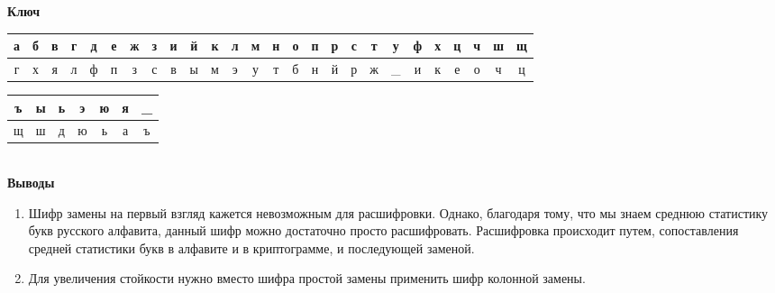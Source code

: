 \documentclass[a4paper,14pt]{extarticle}
\begin{document}
    \begin{center}
        \textbf{Ключ}
    \end{center}
    \vspace{-3em}
    \begin{center}
        \begin{tabular}{|c|c|c|c|c|c|c|c|c|c|c|c|c|c|c|c|c|c|c|c|c|c|c|c|c|c|}
            \hline
            а & б & в & г & д & е & ж & з & и & й & к & л & м & н & о & п & р & с & т & у & ф & х & ц & ч & ш & щ \\
            \hline
            г & х & я & л & ф & п & з & с & в & ы & м & э & у & т & б & н & й & р & ж &\_ & и & к & е & о & ч & ц \\
            \hline
        \end{tabular}
    \end{center}
    \begin{tabular}{|c|c|c|c|c|c|c|}
        \hline
        ъ & ы & ь & э & ю & я & \_ \\
        \hline
        щ & ш & д & ю & ь & а & ъ \\
        \hline
    \end{tabular}\\



    \textbf{Выводы}
    \begin{enumerate}
        \item Шифр замены на первый взгляд кажется невозможным для расшифровки.
        Однако, благодаря тому, что мы знаем среднюю статистику букв русского алфавита,
        данный шифр можно достаточно просто расшифровать. Расшифровка происходит путем,
        сопоставления средней статистики букв в алфавите и в криптограмме, и последующей
        заменой.
        \item Для увеличения стойкости нужно вместо шифра простой замены применить шифр
        колонной замены.

    \end{enumerate}
\end{document}
